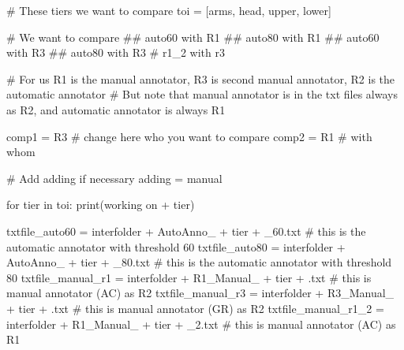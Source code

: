 \documentclass[
  letterpaper,
  DIV=11,
  numbers=noendperiod]{scrreprt}
\newenvironment{Shaded}{\begin{snugshade}}{\end{snugshade}}
\newcommand{\BuiltInTok}[1]{\textcolor[rgb]{0.00,0.23,0.31}{#1}}
\newcommand{\CommentTok}[1]{\textcolor[rgb]{0.37,0.37,0.37}{#1}}
\newcommand{\ControlFlowTok}[1]{\textcolor[rgb]{0.00,0.23,0.31}{#1}}
\newcommand{\KeywordTok}[1]{\textcolor[rgb]{0.00,0.23,0.31}{#1}}
\newcommand{\NormalTok}[1]{\textcolor[rgb]{0.00,0.23,0.31}{#1}}
\newcommand{\OperatorTok}[1]{\textcolor[rgb]{0.37,0.37,0.37}{#1}}
\newcommand{\StringTok}[1]{\textcolor[rgb]{0.13,0.47,0.30}{#1}}
\begin{document}
\begin{Shaded}
\begin{Highlighting}[]
\CommentTok{\# These tiers we want to compare}
\NormalTok{toi }\OperatorTok{=}\NormalTok{ [}\StringTok{\textquotesingle{}arms\textquotesingle{}}\NormalTok{, }\StringTok{\textquotesingle{}head\textquotesingle{}}\NormalTok{, }\StringTok{\textquotesingle{}upper\textquotesingle{}}\NormalTok{, }\StringTok{\textquotesingle{}lower\textquotesingle{}}\NormalTok{] }

\CommentTok{\# We want to compare}
\CommentTok{\#\# auto60 with R1  }
\CommentTok{\#\# auto80 with R1 }
\CommentTok{\#\# auto60 with R3  }
\CommentTok{\#\# auto80 with R3 }
\CommentTok{\# r1\_2 with r3}

\CommentTok{\# For us R1 is the manual annotator, R3 is second manual annotator, R2 is the automatic annotator}
\CommentTok{\# But note that manual annotator is in the txt files always as R2, and automatic annotator is always R1 }

\NormalTok{comp1 }\OperatorTok{=} \StringTok{\textquotesingle{}R3\textquotesingle{}}    \CommentTok{\# change here who you want to compare}
\NormalTok{comp2 }\OperatorTok{=} \StringTok{\textquotesingle{}R1\textquotesingle{}}    \CommentTok{\# with whom}

\CommentTok{\# Add adding if necessary}
\NormalTok{adding }\OperatorTok{=} \StringTok{\textquotesingle{}manual\textquotesingle{}}

\ControlFlowTok{for}\NormalTok{ tier }\KeywordTok{in}\NormalTok{ toi:}
    \BuiltInTok{print}\NormalTok{(}\StringTok{\textquotesingle{}working on \textquotesingle{}} \OperatorTok{+}\NormalTok{ tier)}

\NormalTok{    txtfile\_auto60 }\OperatorTok{=}\NormalTok{ interfolder }\OperatorTok{+} \StringTok{\textquotesingle{}AutoAnno\_\textquotesingle{}} \OperatorTok{+}\NormalTok{ tier }\OperatorTok{+} \StringTok{\textquotesingle{}\_60.txt\textquotesingle{}}        \CommentTok{\# this is the automatic annotator with threshold 60}
\NormalTok{    txtfile\_auto80 }\OperatorTok{=}\NormalTok{ interfolder }\OperatorTok{+} \StringTok{\textquotesingle{}AutoAnno\_\textquotesingle{}} \OperatorTok{+}\NormalTok{ tier }\OperatorTok{+} \StringTok{\textquotesingle{}\_80.txt\textquotesingle{}}        \CommentTok{\# this is the automatic annotator with threshold 80}
\NormalTok{    txtfile\_manual\_r1 }\OperatorTok{=}\NormalTok{ interfolder }\OperatorTok{+} \StringTok{\textquotesingle{}R1\_Manual\_\textquotesingle{}} \OperatorTok{+}\NormalTok{ tier }\OperatorTok{+} \StringTok{\textquotesingle{}.txt\textquotesingle{}}  \CommentTok{\# this is manual annotator (AC) as R2}
\NormalTok{    txtfile\_manual\_r3 }\OperatorTok{=}\NormalTok{ interfolder }\OperatorTok{+} \StringTok{\textquotesingle{}R3\_Manual\_\textquotesingle{}} \OperatorTok{+}\NormalTok{ tier }\OperatorTok{+} \StringTok{\textquotesingle{}.txt\textquotesingle{}}  \CommentTok{\# this is manual annotator (GR) as R2}
\NormalTok{    txtfile\_manual\_r1\_2 }\OperatorTok{=}\NormalTok{ interfolder }\OperatorTok{+} \StringTok{\textquotesingle{}R1\_Manual\_\textquotesingle{}} \OperatorTok{+}\NormalTok{ tier }\OperatorTok{+} \StringTok{\textquotesingle{}\_2.txt\textquotesingle{}}  \CommentTok{\# this is manual annotator (AC) as R1}


\end{Highlighting}
\end{Shaded}
\end{document}
